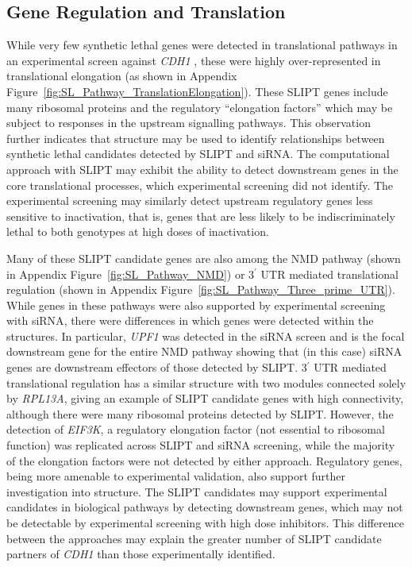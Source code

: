 \FloatBarrier

\subsection{Gene Regulation and Translation}  \label{chapt4:SL_Genes_Translation}

While very few \gls{synthetic lethal} genes were detected in translational pathways in an experimental screen against \textit{CDH1} \citep{Telford2015}, these were highly over-represented in translational elongation (as shown in Appendix Figure~\ref{fig:SL_Pathway_TranslationElongation}). These \gls{SLIPT} genes include many ribosomal proteins and the regulatory ``elongation factors'' which may be subject to responses in the upstream signalling pathways. This observation further indicates that  structure may be used to identify relationships between \gls{synthetic lethal} candidates detected by \gls{SLIPT} and \gls{siRNA}. The computational approach with \gls{SLIPT} may exhibit the ability to detect downstream genes in the core translational processes, which experimental screening did not identify. The experimental screening may similarly detect upstream regulatory genes less sensitive to inactivation, that is, genes that are less likely to be indiscriminately lethal to both genotypes at high doses of inactivation.

Many of these \gls{SLIPT} candidate genes are also among the \gls{NMD} pathway (shown in Appendix Figure~\ref{fig:SL_Pathway_NMD}) or 3$^\prime$ \gls{UTR} mediated translational regulation (shown in Appendix Figure~\ref{fig:SL_Pathway_Three_prime_UTR}). While genes in these pathways were also supported by experimental screening with \gls{siRNA}, there were differences in which genes were detected within the  structures. In particular, \textit{UPF1} was detected in the \gls{siRNA} screen and is the focal downstream gene for the entire \gls{NMD} pathway showing that (in this case) \gls{siRNA} genes are downstream effectors of those detected by \gls{SLIPT}.  3$^\prime$ \gls{UTR} mediated translational regulation has a similar structure with two modules connected solely by \textit{RPL13A}, giving an example of \gls{SLIPT} candidate genes with high connectivity, although there were many ribosomal proteins detected by \gls{SLIPT}. However, the detection of \textit{EIF3K}, a regulatory elongation factor (not \gls{essential} to ribosomal function) was replicated across \gls{SLIPT} and \gls{siRNA} screening, while the majority of the elongation factors were not detected by either approach. Regulatory genes, being more amenable to experimental validation, also support further investigation into  structure. The \gls{SLIPT} candidates may support experimental candidates in biological pathways by detecting downstream genes, which may not be detectable by experimental screening with high dose inhibitors. This difference between the approaches may explain the greater number of \gls{SLIPT} candidate partners of \textit{CDH1} than those experimentally identified.


